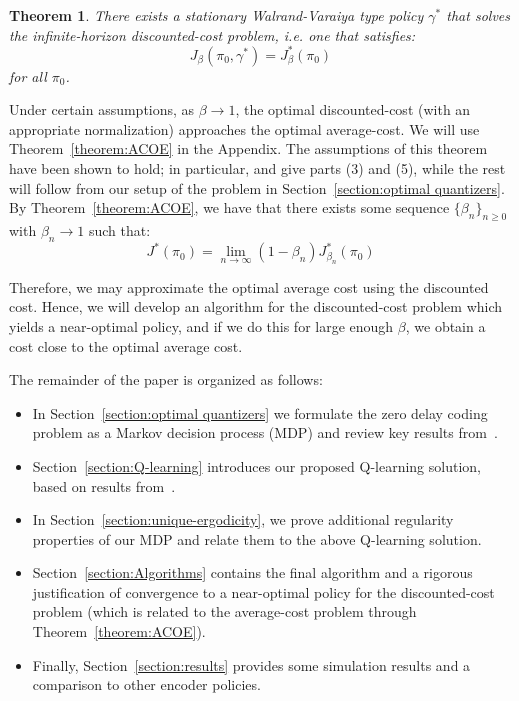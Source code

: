 \documentclass[conference, draftcls, onecolumn]{IEEEtran}
\newtheorem{theorem}{Theorem}
\begin{document}
\begin{theorem}\label{theorem:Wood2}\cite[Proposition 2]{Wood}
    There exists a stationary Walrand-Varaiya type policy \(\gamma^*\) that solves the infinite-horizon discounted-cost problem, i.e. one that satisfies:
    \[J_\beta(\pi_0,\gamma^*) = J_\beta^*(\pi_0)\]
    for all \(\pi_0\).
\end{theorem}

Under certain assumptions, as \(\beta \to 1\), the optimal discounted-cost (with an appropriate normalization) approaches the optimal average-cost. We will use Theorem~\ref{theorem:ACOE} in the Appendix. The assumptions of this theorem have been shown to hold; in particular, \cite[Lemma 11]{Linder} and \cite[Lemma 1]{Wood} give parts (3) and (5), while the rest will follow from our setup of the problem in Section~\ref{section:optimal quantizers}. By Theorem~\ref{theorem:ACOE}, we have that there exists some sequence \(\{\beta_n\}_{n \ge 0}\) with \(\beta_n \to 1\) such that:
\[J^*(\pi_0) = \lim_{n \to \infty}(1-\beta_n)J^*_{\beta_n}(\pi_0)\]

Therefore, we may approximate the optimal average cost using the discounted cost. Hence, we will develop an algorithm for the discounted-cost problem which yields a near-optimal policy, and if we do this for large enough \(\beta\), we obtain a cost close to the optimal average cost.

The remainder of the paper is organized as follows:
\begin{itemize}
    \item In Section~\ref{section:optimal quantizers} we formulate the zero delay coding problem as a Markov decision process (MDP) and review key results from~\cite{Linder, Wood}.
    \item Section~\ref{section:Q-learning} introduces our proposed Q-learning solution, based on results from~\cite{Kara}.
    \item In Section~\ref{section:unique-ergodicity}, we prove additional regularity properties of our MDP and relate them to the above Q-learning solution.
    \item Section~\ref{section:Algorithms} contains the final algorithm and a rigorous justification of convergence to a near-optimal policy for the discounted-cost problem (which is related to the average-cost problem through Theorem~\ref{theorem:ACOE}).
    \item Finally, Section~\ref{section:results} provides some simulation results and a comparison to other encoder policies.
\end{itemize}
\end{document}
